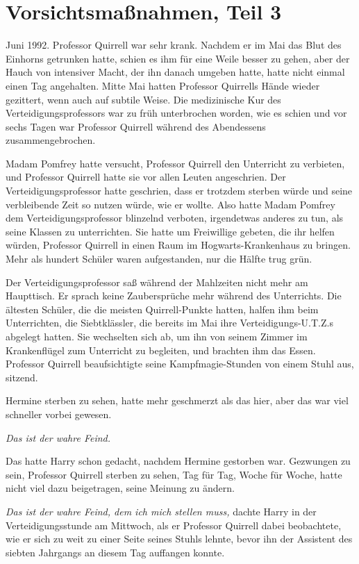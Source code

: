 \chapter{Vorsichtsmaßnahmen, Teil 3}

Juni 1992. Professor Quirrell war sehr krank. Nachdem er im Mai das Blut des
Einhorns getrunken hatte, schien es ihm für eine Weile besser zu gehen, aber der
Hauch von intensiver Macht, der ihn danach umgeben hatte, hatte nicht einmal
einen Tag angehalten. Mitte Mai hatten Professor Quirrells Hände wieder
gezittert, wenn auch auf subtile Weise. Die medizinische Kur des
Verteidigungsprofessors war zu früh unterbrochen worden, wie es schien und vor
sechs Tagen war Professor Quirrell während des Abendessens zusammengebrochen.

Madam Pomfrey hatte versucht, Professor Quirrell den Unterricht zu verbieten,
und Professor Quirrell hatte sie vor allen Leuten angeschrien. Der
Verteidigungsprofessor hatte geschrien, dass er trotzdem sterben würde und seine
verbleibende Zeit so nutzen würde, wie er wollte. Also hatte Madam Pomfrey dem
Verteidigungsprofessor blinzelnd verboten, irgendetwas anderes zu tun, als seine
Klassen zu unterrichten. Sie hatte um Freiwillige gebeten, die ihr helfen
würden, Professor Quirrell in einen Raum im Hogwarts-Krankenhaus zu bringen.
Mehr als hundert Schüler waren aufgestanden, nur die Hälfte trug grün.

Der Verteidigungsprofessor saß während der Mahlzeiten nicht mehr am Haupttisch.
Er sprach keine Zaubersprüche mehr während des Unterrichts. Die ältesten
Schüler, die die meisten Quirrell-Punkte hatten, halfen ihm beim Unterrichten,
die Siebtklässler, die bereits im Mai ihre Verteidigungs-U.T.Z.s abgelegt
hatten. Sie wechselten sich ab, um ihn von seinem Zimmer im Krankenflügel zum
Unterricht zu begleiten, und brachten ihm das Essen. Professor Quirrell
beaufsichtigte seine Kampfmagie-Stunden von einem Stuhl aus, sitzend.

Hermine sterben zu sehen, hatte mehr geschmerzt als das hier, aber das war viel
schneller vorbei gewesen.

\emph{Das ist der wahre Feind.}

Das hatte Harry schon gedacht, nachdem Hermine gestorben war. Gezwungen zu sein,
Professor Quirrell sterben zu sehen, Tag für Tag, Woche für Woche, hatte nicht
viel dazu beigetragen, seine Meinung zu ändern.

\emph{Das ist der wahre Feind, dem ich mich stellen muss, }dachte Harry in der
Verteidigungsstunde am Mittwoch, als er Professor Quirrell dabei beobachtete,
wie er sich zu weit zu einer Seite seines Stuhls lehnte, bevor ihn der Assistent
des siebten Jahrgangs an diesem Tag auffangen konnte.

